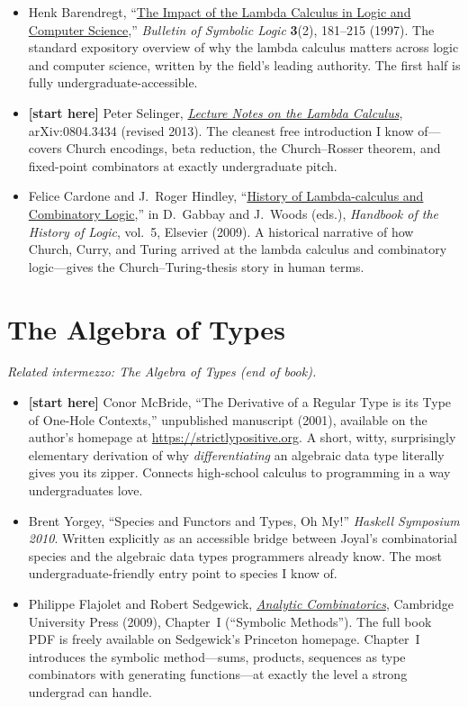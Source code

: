 \documentclass[11pt]{article}
\begin{document}
\begin{itemize}
  \item Henk Barendregt, ``\href{https://www.cambridge.org/core/journals/bulletin-of-symbolic-logic/article/abs/impact-of-the-lambda-calculus-in-logic-and-computer-science/7B63F923EC566E549B093911BFC7470E}{The Impact of the Lambda Calculus in Logic and Computer Science},'' \emph{Bulletin of Symbolic Logic} \textbf{3}(2), 181--215 (1997). The standard expository overview of why the lambda calculus matters across logic and computer science, written by the field's leading authority. The first half is fully undergraduate-accessible.
  \item \textbf{[start here]} Peter Selinger, \emph{\href{https://arxiv.org/abs/0804.3434}{Lecture Notes on the Lambda Calculus}}, arXiv:0804.3434 (revised 2013). The cleanest free introduction I know of---covers Church encodings, beta reduction, the Church--Rosser theorem, and fixed-point combinators at exactly undergraduate pitch.
  \item Felice Cardone and J.\ Roger Hindley, ``\href{http://www.di.unito.it/~felice/pdf/lambdacomb.pdf}{History of Lambda-calculus and Combinatory Logic},'' in D.\ Gabbay and J.\ Woods (eds.), \emph{Handbook of the History of Logic}, vol.~5, Elsevier (2009). A historical narrative of how Church, Curry, and Turing arrived at the lambda calculus and combinatory logic---gives the Church--Turing-thesis story in human terms.
\end{itemize}

\section*{The Algebra of Types}
\emph{Related intermezzo: The Algebra of Types (end of book).}

\begin{itemize}
  \item \textbf{[start here]} Conor McBride, ``The Derivative of a
  Regular Type is its Type of One-Hole Contexts,'' unpublished
  manuscript (2001), available on the author's homepage at
  \url{https://strictlypositive.org}. A short, witty, surprisingly
  elementary derivation of why \emph{differentiating} an algebraic data
  type literally gives you its zipper. Connects high-school calculus to
  programming in a way undergraduates love.
  \item Brent Yorgey, ``Species and Functors and Types, Oh My!'' \emph{Haskell Symposium 2010}. Written explicitly as an accessible bridge between Joyal's combinatorial species and the algebraic data types programmers already know. The most undergraduate-friendly entry point to species I know of.
  \item Philippe Flajolet and Robert Sedgewick, \emph{\href{https://ac.cs.princeton.edu/home/}{Analytic Combinatorics}}, Cambridge University Press (2009), Chapter~I (``Symbolic Methods''). The full book PDF is freely available on Sedgewick's Princeton homepage. Chapter~I introduces the symbolic method---sums, products, sequences as type combinators with generating functions---at exactly the level a strong undergrad can handle.
\end{itemize}
\end{document}
